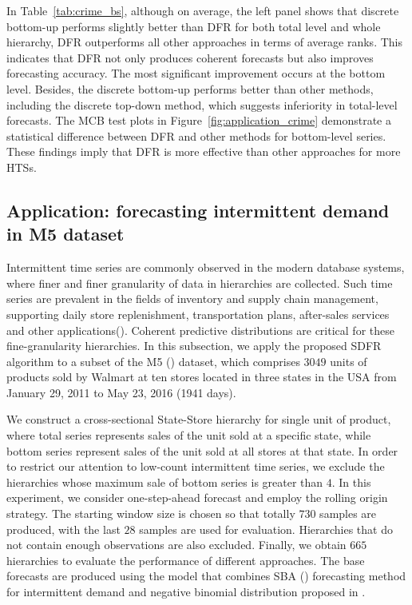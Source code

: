 \documentclass[a4paper,review,12pt,authoryear]{elsarticle}
\theoremstyle{definition}
\begin{document}
     In Table~\ref{tab:crime_bs},  although on average, the left panel shows that discrete bottom-up performs slightly better than DFR for both total level and whole hierarchy, DFR outperforms all other approaches in terms of average ranks. This indicates that DFR not only produces coherent forecasts but also improves forecasting accuracy. The most significant improvement occurs at the bottom level. Besides, the discrete bottom-up performs better than other methods, including the discrete top-down method, which suggests inferiority in total-level forecasts. The MCB test plots in Figure~\ref{fig:application_crime} demonstrate a statistical difference between DFR and other methods for bottom-level series. These findings imply that DFR is more effective than other approaches for more HTSs.

     \subsection{Application: forecasting intermittent demand in M5 dataset}
     \label{sec:M5}

     Intermittent time series are commonly observed in the modern database systems, where finer and finer granularity of data in hierarchies are collected. 
     Such time series are prevalent in the fields of inventory and supply chain management, supporting daily store replenishment, transportation plans, after-sales services and other applications(\citealp{babaiDemandForecastingSupply2022}).
     Coherent predictive distributions are critical for these fine-granularity hierarchies. 
     In this subsection, we apply the proposed SDFR algorithm to a subset of the M5 (\citealp{makridakisM5AccuracyCompetition2022}) dataset, which comprises $3049$ units of products sold by Walmart at ten stores located in three states in the USA from January 29, 2011 to May 23, 2016 (1941 days).
     
    We construct a cross-sectional State-Store hierarchy for single unit of product, where total series represents sales of the unit sold at a specific state, while bottom series represent sales of the unit sold at all stores at that state. 
    In order to restrict our attention to low-count intermittent time series, we exclude the hierarchies whose maximum sale of bottom series is greater than $4$. 
    In this experiment, we consider one-step-ahead forecast and employ the rolling origin strategy. The starting window size is chosen so that totally $730$ samples are produced, with the last $28$ samples are used for evaluation.
    Hierarchies that do not contain enough observations are also excluded.
    Finally, we obtain $665$ hierarchies to evaluate the performance of different approaches. 
    The base forecasts are produced using the model that combines SBA (\citealp{syntetosAccuracyIntermittentDemand2005}) forecasting method for intermittent demand and negative binomial distribution proposed in \cite{kolassaEvaluatingPredictiveCount2016}.
\end{document}
